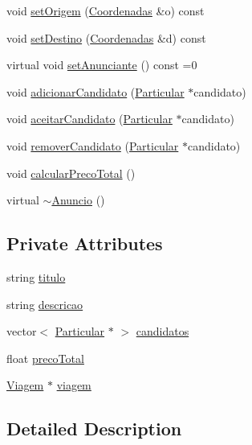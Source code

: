 \begin{DoxyCompactItemize}
void \hyperlink{class_anuncio_ac88555aa5c54bc552eb6a31787334e39}{set\+Origem} (\hyperlink{class_coordenadas}{Coordenadas} \&o) const 
\item 
void \hyperlink{class_anuncio_add212eaa271e366dccaa82a8f2bee736}{set\+Destino} (\hyperlink{class_coordenadas}{Coordenadas} \&d) const 
\item 
virtual void \hyperlink{class_anuncio_ae1271413eb8f63fb054253057706de9a}{set\+Anunciante} () const =0
\item 
void \hyperlink{class_anuncio_a0c9937cd0d6f4748031e5aec7b61d496}{adicionar\+Candidato} (\hyperlink{class_particular}{Particular} $\ast$candidato)
\item 
void \hyperlink{class_anuncio_a3b7642bf06c1aa75dada38c7d015cb8d}{aceitar\+Candidato} (\hyperlink{class_particular}{Particular} $\ast$candidato)
\item 
void \hyperlink{class_anuncio_a755de86be5f1b66d66a6ddbe3f217246}{remover\+Candidato} (\hyperlink{class_particular}{Particular} $\ast$candidato)
\item 
void \hyperlink{class_anuncio_ac49d84d1a011803f9676f1e47c252125}{calcular\+Preco\+Total} ()
\item 
virtual \hyperlink{class_anuncio_acbc854230687f95adca2fdeaa377921b}{$\sim$\+Anuncio} ()
\end{DoxyCompactItemize}
\subsection*{Private Attributes}
\begin{DoxyCompactItemize}
\item 
string \hyperlink{class_anuncio_adb34bedd8220f42b9ee37662c21313e6}{titulo}
\item 
string \hyperlink{class_anuncio_aa6a9eb8d08cb06d16061b006eb2c8b97}{descricao}
\item 
vector$<$ \hyperlink{class_particular}{Particular} $\ast$ $>$ \hyperlink{class_anuncio_a387f6bd1b88720d5cf0b53462e5dc0aa}{candidatos}
\item 
float \hyperlink{class_anuncio_a8ba7cc797b8b582c596038a17e9bce3b}{preco\+Total}
\item 
\hyperlink{class_viagem}{Viagem} $\ast$ \hyperlink{class_anuncio_aa225374a19420f56f5abc258d96b691a}{viagem}
\end{DoxyCompactItemize}


\subsection{Detailed Description}


